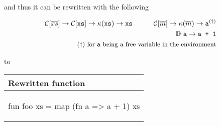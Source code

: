 \begin{example}
  \noindent
  and thus it can be rewritten with the following
 
  \begin{eqnarray*}[c]
    \mathcal{C}[\ol{xs}]  -> \mathcal{C}[\ttt{xs}] -> \kappa{(\ttt{xs})} -> \ttt{xs}
    \qquad\quad
    \mathcal{C}[\ol{m}] -> \kappa{(\ol{m})} -> \ttt{a}^{(\dag)} 
    \\ 
    \mathbb{D}\ \ttt{a} -> \ttt{a + 1}
    \\
    \text{\small{$(\dag)$} for \ttt{a} being a free variable in the environment}
  \end{eqnarray*}
  
  \noindent
  to
  
  \begin{center}
    \begin{tabular}{|l|}
      \hline
      \textbf{Rewritten function} \\ \hline
      \begin{sml}
fun foo xs = map (fn a => a + 1) xs
      \end{sml} \\ \hline
    \end{tabular}
  \end{center}

\end{example}

